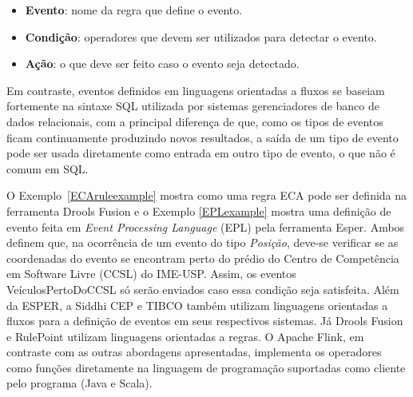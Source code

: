 \begin{itemize}
\item \textbf{Evento}: nome da regra que define o evento. 
\item \textbf{Condição}: operadores que devem ser utilizados para detectar o evento. 
\item \textbf{Ação}: o que deve ser feito caso o evento seja detectado. 
\end{itemize} 



Em contraste, eventos definidos em linguagens orientadas a fluxos se baseiam fortemente na sintaxe SQL utilizada por sistemas gerenciadores de banco de dados  relacionais, com a principal diferença de que, como os tipos de eventos ficam continuamente produzindo novos resultados, a saída de um tipo de evento pode ser usada diretamente como entrada em outro tipo de evento, o que não é comum em SQL.




O Exemplo~\ref{ECAruleexample} mostra como uma regra ECA pode ser definida na ferramenta Drools Fusion e o Exemplo \ref{EPLexample} mostra uma definição de evento feita em \textit{Event Processing Language} (EPL) pela ferramenta Esper. Ambos definem que, na ocorrência de um evento do tipo \textit{Posição}, deve-se  verificar se as coordenadas do evento se encontram perto do prédio do Centro de Competência em Software Livre (CCSL) do IME-USP. Assim, os eventos VeículosPertoDoCCSL só serão enviados caso essa condição seja satisfeita.
Além da ESPER, a Siddhi CEP e TIBCO também utilizam linguagens orientadas a fluxos para a definição de eventos em seus respectivos sistemas. Já Drools Fusion e RulePoint utilizam linguagens orientadas a regras. 
O Apache Flink, em contraste com as outras abordagens apresentadas, implementa os operadores como funções diretamente na linguagem de programação suportadas como cliente pelo programa (Java e Scala). %


